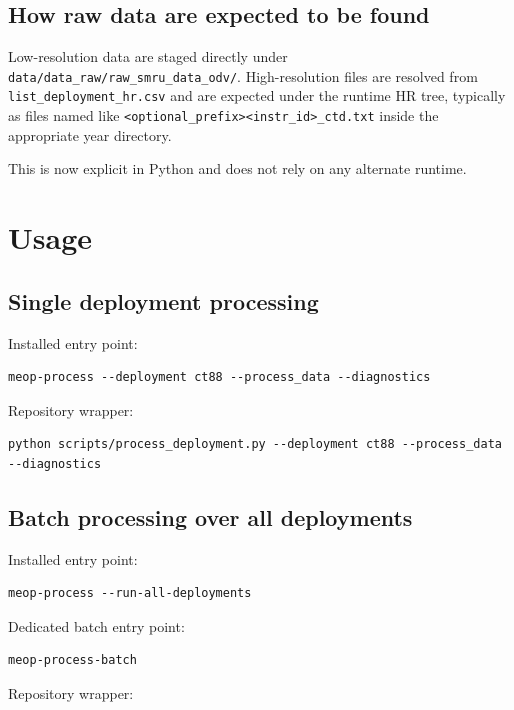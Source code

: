 \documentclass[11pt,a4paper]{article}
\newcommand{\pkg}[1]{\texttt{#1}}
\begin{document}
\subsection{How raw data are expected to be found}

Low-resolution data are staged directly under \pkg{data/data\_raw/raw\_smru\_data\_odv/}. High-resolution files are resolved from \pkg{list\_deployment\_hr.csv} and are expected under the runtime HR tree, typically as files named like \pkg{<optional\_prefix><instr\_id>\_ctd.txt} inside the appropriate year directory.

This is now explicit in Python and does not rely on any alternate runtime.

\section{Usage}

\subsection{Single deployment processing}

Installed entry point:

\begin{lstlisting}[style=meopcode]
meop-process --deployment ct88 --process_data --diagnostics
\end{lstlisting}

Repository wrapper:

\begin{lstlisting}[style=meopcode]
python scripts/process_deployment.py --deployment ct88 --process_data --diagnostics
\end{lstlisting}

\subsection{Batch processing over all deployments}

Installed entry point:

\begin{lstlisting}[style=meopcode]
meop-process --run-all-deployments
\end{lstlisting}

Dedicated batch entry point:

\begin{lstlisting}[style=meopcode]
meop-process-batch
\end{lstlisting}

Repository wrapper:
\end{document}
